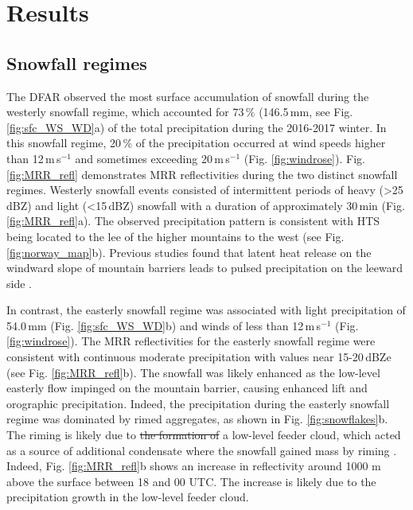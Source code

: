 \documentclass{ametsocV5}
\providecommand{\DIFadd}[1]{{\protect\color{blue}\uwave{#1}}} %
\providecommand{\DIFdel}[1]{{\protect\color{red}\sout{#1}}}                      %
\providecommand{\DIFaddbegin}{} %
\providecommand{\DIFaddend}{} %
\providecommand{\DIFdelbegin}{} %
\providecommand{\DIFdelend}{} %
\newcommand{\DIFscaledelfig}{0.5}
\newlength{\DIFdelgraphicswidth} %
\newlength{\DIFdelgraphicsheight} %
\newcommand{\DIFaddincludegraphics}[2][]{{\color{blue}\fbox{\DIFOincludegraphics[#1]{#2}}}} %
\newcommand{\DIFdelincludegraphics}[2][]{%
\sbox{\DIFdelgraphicsbox}{\DIFOincludegraphics[#1]{#2}}%
\settoboxwidth{\DIFdelgraphicswidth}{\DIFdelgraphicsbox} %
\settoboxtotalheight{\DIFdelgraphicsheight}{\DIFdelgraphicsbox} %
\scalebox{\DIFscaledelfig}{%
\parbox[b]{\DIFdelgraphicswidth}{\usebox{\DIFdelgraphicsbox}\\[-\baselineskip] \rule{\DIFdelgraphicswidth}{0em}}\llap{\resizebox{\DIFdelgraphicswidth}{\DIFdelgraphicsheight}{%
\setlength{\unitlength}{\DIFdelgraphicswidth}%
\begin{picture}(1,1)%
\thicklines\linethickness{2pt} %
{\color[rgb]{1,0,0}\put(0,0){\framebox(1,1){}}}%
{\color[rgb]{1,0,0}\put(0,0){\line( 1,1){1}}}%
{\color[rgb]{1,0,0}\put(0,1){\line(1,-1){1}}}%
\end{picture}%
}\hspace*{3pt}}} %
} %
\DeclareRobustCommand{\DIFaddbegin}{\DIFOaddbegin \let\includegraphics\DIFaddincludegraphics} %
\DeclareRobustCommand{\DIFaddend}{\DIFOaddend \let\includegraphics\DIFOincludegraphics} %
\DeclareRobustCommand{\DIFdelbegin}{\DIFOdelbegin \let\includegraphics\DIFdelincludegraphics} %
\DeclareRobustCommand{\DIFdelend}{\DIFOaddend \let\includegraphics\DIFOincludegraphics} %
\begin{document}
\section{Results}\label{sec:res}
	\subsection{Snowfall regimes}\label{sec:res:snowfall_regimes}
		The DFAR observed the most surface accumulation of snowfall during the westerly snowfall regime, which accounted for 73\,\% (146.5\,mm, see Fig. \ref{fig:sfc_WS_WD}a) of the total precipitation during the 2016-2017 winter. In this snowfall regime, 20\,\% of the precipitation occurred at wind speeds higher than 12\,m\,s$^{-1}$ and sometimes exceeding 20\,m\,s$^{-1}$ (Fig. \ref{fig:windrose}). Fig. \ref{fig:MRR_refl} demonstrates MRR reflectivities during the two distinct snowfall regimes. Westerly snowfall events consisted of intermittent periods of heavy (\textgreater 25\,dBZ) and light (\textless 15\,dBZ) snowfall with a duration of approximately 30\,min (Fig. \ref{fig:MRR_refl}a). The observed precipitation pattern is consistent with HTS being located to the lee of the higher mountains to the west (see Fig. \ref{fig:norway_map}b). Previous studies found that latent heat release on the windward slope of mountain barriers leads to pulsed precipitation on the leeward side \citep{sinclair_factors_1997,kaplan_role_2009}. 

		In contrast, the easterly snowfall regime was associated with light precipitation of 54.0\,mm (Fig. \ref{fig:sfc_WS_WD}b) and  winds of less than  12\,m\,s$^{-1}$ (Fig. \ref{fig:windrose}). The MRR reflectivities for the easterly snowfall regime were consistent with continuous moderate precipitation with values near 15-20\,dBZe (see Fig. \ref{fig:MRR_refl}b). The snowfall was likely enhanced as the low-level easterly flow impinged on the mountain barrier, causing enhanced lift and orographic precipitation. Indeed, the precipitation during the easterly snowfall regime was dominated by rimed aggregates, as shown in Fig. \ref{fig:snowflakes}b. The riming is likely due to \DIFdelbegin \DIFdel{the formation of }\DIFdelend \DIFaddbegin \DIFadd{forming }\DIFaddend a low-level feeder cloud, which acted as a source of additional condensate where the snowfall gained mass by riming \citep{borys_mountaintop_2003,lowenthal_isotopic_2016}. Indeed, Fig. \ref{fig:MRR_refl}b shows an increase in reflectivity around 1000 m above the surface between 18 and 00 UTC. The increase is likely due to the precipitation growth in the low-level feeder cloud.
\end{document}
